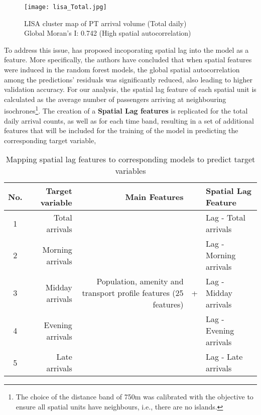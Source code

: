\begin{figure}[ht]
    \centering
    \texttt{[image: lisa\_Total.jpg]}
    \captionsetup{justification=centering}
    \caption{LISA cluster map of PT arrival volume (Total daily)\\Global Moran's I: 0.742 (High spatial autocorrelation)}
    \label{fig:lisacluster}
\end{figure}

To address this issue, \citet{liuIncorporatingSpatialAutocorrelation2022} has proposed incoporating spatial lag into the model as a feature. More specifically, the authors have concluded that when spatial features were induced in the random forest models, the global spatial autocorrelation among the predictions' residuals was significantly reduced, also leading to higher validation accuracy. For our analysis, the spatial lag feature of each spatial unit is calculated as the average number of passengers arriving at neighbouring isochrones\footnote{The choice of the distance band of 750m was calibrated with the objective to ensure all spatial units have neighbours, i.e., there are no islands.}. The creation of a \textbf{Spatial Lag features} is replicated for the total daily arrival counts, as well as for each time band, resulting in a set of additional features that will be included for the training of the model in predicting the corresponding target variable,

\begin{table}[ht]
    \centering
    \renewcommand{\arraystretch}{1.5}
    \begin{tabular}{|c r || r c l|}
        \hline
        \rowcolor{lightgray}
        \textbf{No.} & \textbf{Target variable} & \textbf{Main Features} & &\textbf{Spatial Lag Feature}\\
        
        \hline
        1 & Total arrivals  &  \multirow{5}{12em}{Population, amenity and transport profile features (25 features)} 
                                &  \multirow{5}{*}{+}       &   Lag - Total arrivals    \\ 
        2 & Morning arrivals    &                       &   &   Lag - Morning arrivals  \\ 
        3 & Midday arrivals     &                       &   &   Lag - Midday arrivals   \\ 
        4 & Evening arrivals    &                       &   &   Lag - Evening arrivals  \\ 
        5 & Late arrivals       &                       &   &   Lag - Late arrivals     \\
        \hline
    \end{tabular}
    \caption{Mapping spatial lag features to corresponding models to predict target variables}
    \label{tab:spatiallag}
\end{table}



